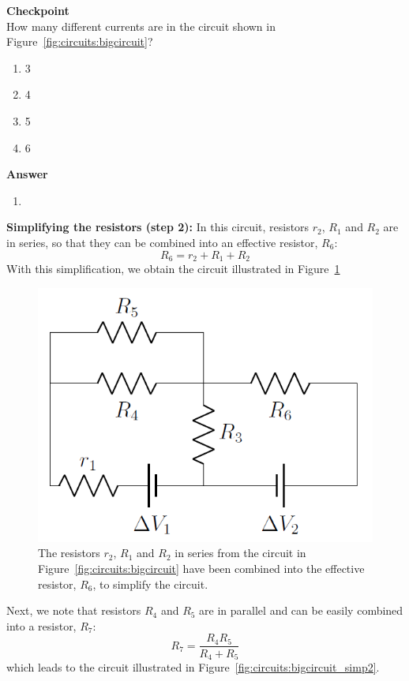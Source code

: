 \begin{framed}
\textbf{Checkpoint}\\
How many different currents are in the circuit shown in Figure~\ref{fig:circuits:bigcircuit}?

\begin{enumerate}
\item 3
\item 4
\item 5
\item 6
\end{enumerate}

\begin{framed}
\textbf{Answer}\\
\begin{enumerate}[resume]
\item
\end{enumerate}
\end{framed}
\end{framed}

\textbf{Simplifying the resistors (step 2):} In this circuit, resistors $r_2$, $R_1$ and $R_2$ are in series, so that they can be combined into an effective resistor, $R_6$:
\begin{equation}
R_6=r_2+R_1+R_2
\end{equation}
With this simplification, we obtain the circuit illustrated in Figure~\ref{fig:circuits:bigcircuit_simp1}

\begin{figure}[!htbp]
\centering
\includegraphics[width=0.42\linewidth]{files/bigcircuit_simp1-c3aa371fb88c44134be8c89020416c77.png}
\caption[]{The resistors $r_2$, $R_1$ and $R_2$ in series from the circuit in Figure~\ref{fig:circuits:bigcircuit} have been combined into the effective resistor, $R_6$, to simplify the circuit.}
\label{fig:circuits:bigcircuit_simp1}
\end{figure}

Next, we note that resistors $R_4$ and $R_5$ are in parallel and can be easily combined into a resistor, $R_7$:
\begin{equation}
R_7=\frac{R_4R_5}{R_4+R_5}
\end{equation}
which leads to the circuit illustrated in Figure~\ref{fig:circuits:bigcircuit_simp2}.

